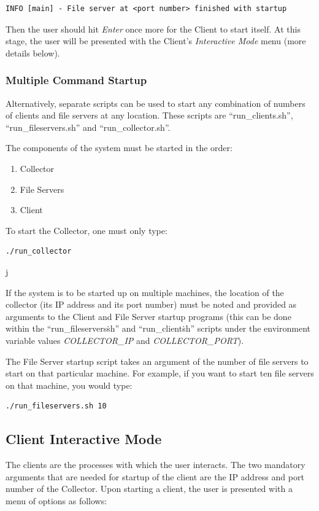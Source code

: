 \documentclass
[english,a4paper]{article}
\begin{document}
\begin{verbatim}
INFO [main] - File server at <port number> finished with startup
\end{verbatim}

Then the user should hit \emph{Enter} once more for the Client to
start itself. At this stage, the user will be presented with the
Client's \emph{Interactive Mode} menu (more details below).

\subsubsection{Multiple Command Startup}
Alternatively, separate scripts can be used to start any
combination of numbers of clients and file servers at any
location. These scripts are ``run\_clients.sh'',
``run\_fileservers.sh'' and ``run\_collector.sh''.

The components of the system must be started in the order:

\begin{enumerate}
\item{Collector}
\item{File Servers}
\item{Client}
\end{enumerate}

To start the Collector, one must only type:

\begin{verbatim}
./run_collector
\end{verbatim}j

If the system is to be started up on multiple machines, the location
of the collector (its IP address and its port number) must be noted
and provided as arguments to the Client and File Server startup
programs (this can be done within the ``run\_fileservers\.sh'' and
``run\_client\.sh'' scripts under the environment variable values
\emph{COLLECTOR\_IP} and \emph{COLLECTOR\_PORT}).

The File Server startup script takes an argument of the number of file
servers to start on that particular machine. For example, if you want
to start ten file servers on that machine, you would type:

\begin{verbatim}
./run_fileservers.sh 10
\end{verbatim}


\subsection{Client Interactive Mode}
The clients are the processes with which the user interacts. The two mandatory arguments that are needed for startup of the client are the IP address and port number of the Collector. Upon starting a client, the user is presented with a menu of options as follows:
\end{document}
